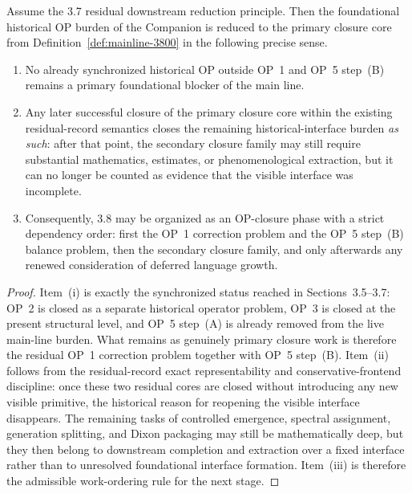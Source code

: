 \begin{theorem}
\label{thm:mainline-3800}
Assume the 3.7 residual downstream reduction principle. Then the foundational historical OP burden of the Companion is reduced to the primary closure core from Definition~\ref{def:mainline-3800} in the following precise sense.
\begin{enumerate}[label=(\roman*), leftmargin=2em]
  \item No already synchronized historical OP outside OP~1 and OP~5 step~(B) remains a primary foundational blocker of the main line.
  \item Any later successful closure of the primary closure core within the existing residual-record semantics closes the remaining historical-interface burden \emph{as such}: after that point, the secondary closure family may still require substantial mathematics, estimates, or phenomenological extraction, but it can no longer be counted as evidence that the visible interface was incomplete.
  \item Consequently, 3.8 may be organized as an OP-closure phase with a strict dependency order: first the OP~1 correction problem and the OP~5 step~(B) balance problem, then the secondary closure family, and only afterwards any renewed consideration of deferred language growth.
\end{enumerate}
\end{theorem}

\begin{proof}
Item~(i) is exactly the synchronized status reached in Sections~3.5--3.7: OP~2 is closed as a separate historical operator problem, OP~3 is closed at the present structural level, and OP~5 step~(A) is already removed from the live main-line burden. What remains as genuinely primary closure work is therefore the residual OP~1 correction problem together with OP~5 step~(B). Item~(ii) follows from the residual-record exact representability and conservative-frontend discipline: once these two residual cores are closed without introducing any new visible primitive, the historical reason for reopening the visible interface disappears. The remaining tasks of controlled emergence, spectral assignment, generation splitting, and Dixon packaging may still be mathematically deep, but they then belong to downstream completion and extraction over a fixed interface rather than to unresolved foundational interface formation. Item~(iii) is therefore the admissible work-ordering rule for the next stage.
\end{proof}

